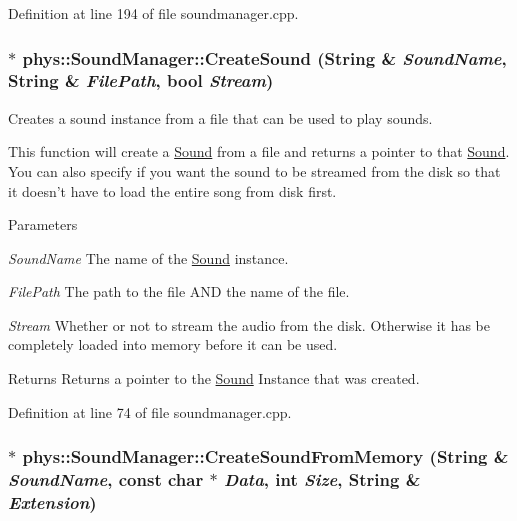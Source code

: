 Definition at line 194 of file soundmanager.cpp.

\hypertarget{classphys_1_1SoundManager_ac9e68fef909b72110e9b68ff2674bcbb}{
\subsubsection[{CreateSound}]{ $\ast$ phys::SoundManager::CreateSound ({\bf String} \& {\em SoundName}, \/  {\bf String} \& {\em FilePath}, \/  bool {\em Stream})}}
\label{d1/dc4/classphys_1_1SoundManager_ac9e68fef909b72110e9b68ff2674bcbb}


Creates a sound instance from a file that can be used to play sounds. 

This function will create a \hyperlink{classphys_1_1Sound}{Sound} from a file and returns a pointer to that \hyperlink{classphys_1_1Sound}{Sound}. You can also specify if you want the sound to be streamed from the disk so that it doesn't have to load the entire song from disk first. 
\begin{DoxyParams}{Parameters}
\item[{\em SoundName}]The name of the \hyperlink{classphys_1_1Sound}{Sound} instance. \item[{\em FilePath}]The path to the file AND the name of the file. \item[{\em Stream}]Whether or not to stream the audio from the disk. Otherwise it has be completely loaded into memory before it can be used. \end{DoxyParams}
\begin{DoxyReturn}{Returns}
Returns a pointer to the \hyperlink{classphys_1_1Sound}{Sound} Instance that was created. 
\end{DoxyReturn}


Definition at line 74 of file soundmanager.cpp.

\hypertarget{classphys_1_1SoundManager_aa039c3d7a5ee961be0934a58fd3826fa}{
\subsubsection[{CreateSoundFromMemory}]{ $\ast$ phys::SoundManager::CreateSoundFromMemory ({\bf String} \& {\em SoundName}, \/  const char $\ast$ {\em Data}, \/  int {\em Size}, \/  {\bf String} \& {\em Extension})}}
\label{d1/dc4/classphys_1_1SoundManager_aa039c3d7a5ee961be0934a58fd3826fa}


